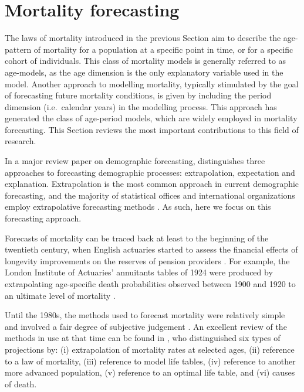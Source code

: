 \documentclass[Thesis]{subfiles}
\begin{document}
\section{Mortality forecasting}\label{Sec:Ch1sec3}
The laws of mortality introduced in the previous Section aim to describe the age-pattern of mortality for a population at a specific point in time, or for a specific cohort of individuals. This class of mortality models is generally referred to as age-models, as the age dimension is the only explanatory variable used in the model. Another approach to modelling mortality, typically stimulated by the goal of forecasting future mortality conditions, is given by including the period dimension (i.e.~calendar years) in the modelling process. This approach has generated the class of age-period models, which are widely employed in mortality forecasting. This Section reviews the most important contributions to this field of research.

In a major review paper on demographic forecasting, \cite{booth2006demographic} distinguishes three approaches to forecasting demographic processes: extrapolation, expectation and explanation. Extrapolation is the most common approach in current demographic forecasting, and the majority of statistical offices and international organizations employ extrapolative forecasting methods \citep{booth2008mortality,stoeldraijer2013impact}. As such, here we focus on this forecasting approach.

Forecasts of mortality can be traced back at least to the beginning of the twentieth century, when English actuaries started to assess the financial effects of longevity improvements on the reserves of pension providers \citep{pollard1987projection}. For example, the London Institute of Actuaries' annuitants tables of 1924 were produced by extrapolating age-specific death probabilities observed between 1900 and 1920 to an ultimate level of mortality \cite[][pp.~183--193]{anderson1948actuarial}. 

Until the 1980s, the methods used to forecast mortality were relatively simple and involved a fair degree of subjective judgement \citep{booth2008mortality}. An excellent review of the methods in use at that time can be found in \cite{pollard1987projection}, who distinguished six types of projections by: (i) extrapolation of mortality rates at selected ages, (ii) reference to a law of mortality, (iii) reference to model life tables, (iv) reference to another more advanced population, (v) reference to an optimal life table, and (vi) causes of death.
\end{document}
